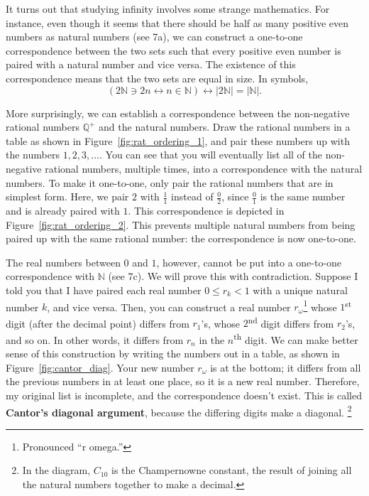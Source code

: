 \documentclass[../gatm.tex]{subfiles}
\begin{document}
It turns out that studying infinity involves some strange mathematics. For instance, even though it seems that there should be half as many positive even numbers as natural numbers (see 7a), we can construct a one-to-one correspondence between the two sets such that every positive even number is paired with a natural number and vice versa. The existence of this correspondence means that the two sets are equal in size. In symbols, $$(2\mathbb{N} \ni 2n \leftrightarrow n \in \mathbb{N}) \leftrightarrow |2\mathbb{N}|=|\mathbb{N}|.$$ %

More surprisingly, we can establish a correspondence between the non-negative rational numbers $\mathbb{Q}^+$ and the natural numbers. Draw the rational numbers in a table as shown in Figure~\ref{fig:rat_ordering_1}, and pair these numbers up with the numbers $1,2,3,$.... You can see that you will eventually list all of the non-negative rational numbers, multiple times, into a correspondence with the natural numbers. To make it one-to-one, only pair the rational numbers that are in simplest form. Here, we pair $2$ with $\frac{1}{1}$ instead of $\frac{0}{2}$, since $\frac{0}{1}$ is the same number and is already paired with $1$. This correspondence is depicted in Figure~\ref{fig:rat_ordering_2}. This prevents multiple natural numbers from being paired up with the same rational number: the correspondence is now one-to-one.

The real numbers between $0$ and $1$, however, cannot be put into a one-to-one correspondence with $\mathbb{N}$ (see 7c). We will prove this with contradiction. Suppose I told you that I have paired each real number $0 \leq r_k < 1$ with a unique natural number $k$, and vice versa. Then, you can construct a real number $r_\omega$\footnote{Pronounced ``r omega.''} whose $1$\textsuperscript{st} digit (after the decimal point) differs from $r_1$’s, whose $2$\textsuperscript{nd} digit differs from $r_2$’s, and so on. In other words, it differs from $r_n$ in the $n$\textsuperscript{th} digit. We can make better sense of this construction by writing the numbers out in a table, as shown in Figure~\ref{fig:cantor_diag}. Your new number $r_\omega$ is at the bottom; it differs from all the previous numbers in at least one place, so it is a new real number. Therefore, my original list is incomplete, and the correspondence doesn’t exist. This is called \textbf{Cantor’s diagonal argument}, because the differing digits make a diagonal. \footnote{In the diagram, $C_{10}$ is the Champernowne constant, the result of joining all the natural numbers together to make a decimal.} %
\end{document}
